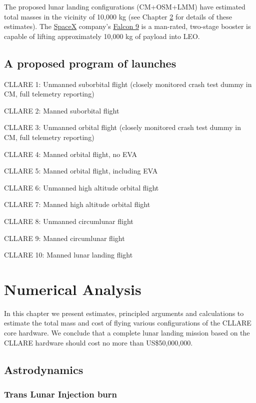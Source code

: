 \documentclass{report}
\begin{document}
The proposed lunar landing configurations (CM+OSM+LMM) have estimated total masses in the vicinity of 10,000 kg (see Chapter \ref{chap:numeric} for details of these estimates).  The \href{http://spacex.com}{SpaceX} company's \href{http://spacex.com/falcon9.php}{Falcon 9} is a man-rated, two-stage booster is capable of lifting approximately 10,000 kg of payload into LEO.

\section{A proposed program of launches}

CLLARE 1: Unmanned suborbital flight (closely monitored crash test dummy in CM, full telemetry reporting)

CLLARE 2: Manned suborbital flight

CLLARE 3: Unmanned orbital flight (closely monitored crash test dummy in CM, full telemetry reporting)

CLLARE 4: Manned orbital flight, no EVA

CLLARE 5: Manned orbital flight, including EVA

CLLARE 6: Unmanned high altitude orbital flight

CLLARE 7: Manned high altitude orbital flight

CLLARE 8: Unmanned circumlunar flight

CLLARE 9: Manned circumlunar flight

CLLARE 10: Manned lunar landing flight


\chapter{Numerical Analysis} \label{chap:numeric}

In this chapter we present estimates, principled arguments and calculations to estimate the total mass and cost of flying various configurations of the CLLARE core hardware.  We conclude that a complete lunar landing mission based on the CLLARE hardware should cost no more than US\$50,000,000.

\section{Astrodynamics}

\subsection{Trans Lunar Injection burn} \label{sec:tli}
\end{document}
